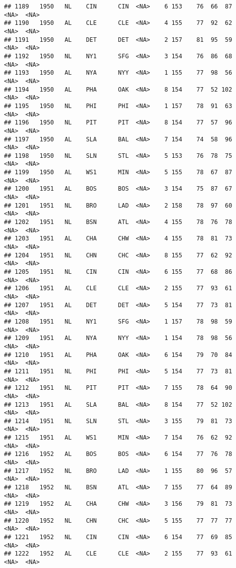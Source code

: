 \documentclass[]{article}
\begin{document}
\begin{verbatim}
## 1189   1950   NL    CIN      CIN  <NA>    6 153    76  66  87   <NA>  <NA>
## 1190   1950   AL    CLE      CLE  <NA>    4 155    77  92  62   <NA>  <NA>
## 1191   1950   AL    DET      DET  <NA>    2 157    81  95  59   <NA>  <NA>
## 1192   1950   NL    NY1      SFG  <NA>    3 154    76  86  68   <NA>  <NA>
## 1193   1950   AL    NYA      NYY  <NA>    1 155    77  98  56   <NA>  <NA>
## 1194   1950   AL    PHA      OAK  <NA>    8 154    77  52 102   <NA>  <NA>
## 1195   1950   NL    PHI      PHI  <NA>    1 157    78  91  63   <NA>  <NA>
## 1196   1950   NL    PIT      PIT  <NA>    8 154    77  57  96   <NA>  <NA>
## 1197   1950   AL    SLA      BAL  <NA>    7 154    74  58  96   <NA>  <NA>
## 1198   1950   NL    SLN      STL  <NA>    5 153    76  78  75   <NA>  <NA>
## 1199   1950   AL    WS1      MIN  <NA>    5 155    78  67  87   <NA>  <NA>
## 1200   1951   AL    BOS      BOS  <NA>    3 154    75  87  67   <NA>  <NA>
## 1201   1951   NL    BRO      LAD  <NA>    2 158    78  97  60   <NA>  <NA>
## 1202   1951   NL    BSN      ATL  <NA>    4 155    78  76  78   <NA>  <NA>
## 1203   1951   AL    CHA      CHW  <NA>    4 155    78  81  73   <NA>  <NA>
## 1204   1951   NL    CHN      CHC  <NA>    8 155    77  62  92   <NA>  <NA>
## 1205   1951   NL    CIN      CIN  <NA>    6 155    77  68  86   <NA>  <NA>
## 1206   1951   AL    CLE      CLE  <NA>    2 155    77  93  61   <NA>  <NA>
## 1207   1951   AL    DET      DET  <NA>    5 154    77  73  81   <NA>  <NA>
## 1208   1951   NL    NY1      SFG  <NA>    1 157    78  98  59   <NA>  <NA>
## 1209   1951   AL    NYA      NYY  <NA>    1 154    78  98  56   <NA>  <NA>
## 1210   1951   AL    PHA      OAK  <NA>    6 154    79  70  84   <NA>  <NA>
## 1211   1951   NL    PHI      PHI  <NA>    5 154    77  73  81   <NA>  <NA>
## 1212   1951   NL    PIT      PIT  <NA>    7 155    78  64  90   <NA>  <NA>
## 1213   1951   AL    SLA      BAL  <NA>    8 154    77  52 102   <NA>  <NA>
## 1214   1951   NL    SLN      STL  <NA>    3 155    79  81  73   <NA>  <NA>
## 1215   1951   AL    WS1      MIN  <NA>    7 154    76  62  92   <NA>  <NA>
## 1216   1952   AL    BOS      BOS  <NA>    6 154    77  76  78   <NA>  <NA>
## 1217   1952   NL    BRO      LAD  <NA>    1 155    80  96  57   <NA>  <NA>
## 1218   1952   NL    BSN      ATL  <NA>    7 155    77  64  89   <NA>  <NA>
## 1219   1952   AL    CHA      CHW  <NA>    3 156    79  81  73   <NA>  <NA>
## 1220   1952   NL    CHN      CHC  <NA>    5 155    77  77  77   <NA>  <NA>
## 1221   1952   NL    CIN      CIN  <NA>    6 154    77  69  85   <NA>  <NA>
## 1222   1952   AL    CLE      CLE  <NA>    2 155    77  93  61   <NA>  <NA>

\end{verbatim}
\end{document}

